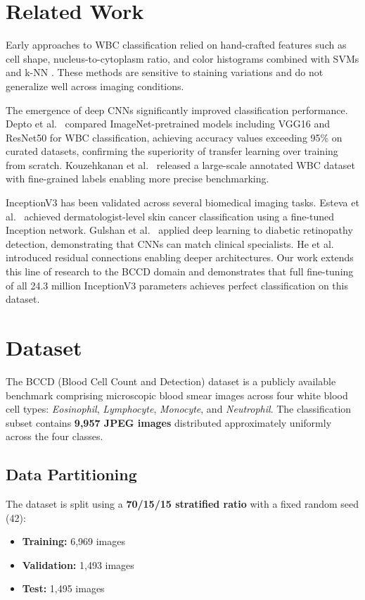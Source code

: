 \documentclass[conference]{IEEEtran}
\begin{document}
\section{Related Work}

Early approaches to WBC classification relied on hand-crafted features such as cell shape, nucleus-to-cytoplasm ratio, and color histograms combined with SVMs and k-NN \cite{kouz2022}. These methods are sensitive to staining variations and do not generalize well across imaging conditions.

The emergence of deep CNNs significantly improved classification performance. Depto et al.\ \cite{depto2021} compared ImageNet-pretrained models including VGG16 and ResNet50 for WBC classification, achieving accuracy values exceeding 95\% on curated datasets, confirming the superiority of transfer learning over training from scratch. Kouzehkanan et al.\ \cite{kouz2022} released a large-scale annotated WBC dataset with fine-grained labels enabling more precise benchmarking.

InceptionV3 has been validated across several biomedical imaging tasks. Esteva et al.\ \cite{esteva2017} achieved dermatologist-level skin cancer classification using a fine-tuned Inception network. Gulshan et al.\ \cite{gulshan2016} applied deep learning to diabetic retinopathy detection, demonstrating that CNNs can match clinical specialists. He et al.\ \cite{he2016} introduced residual connections enabling deeper architectures. Our work extends this line of research to the BCCD domain and demonstrates that full fine-tuning of all 24.3 million InceptionV3 parameters achieves perfect classification on this dataset.

\section{Dataset}

The BCCD (Blood Cell Count and Detection) dataset \cite{bccd2026} is a publicly available benchmark comprising microscopic blood smear images across four white blood cell types: \textit{Eosinophil}, \textit{Lymphocyte}, \textit{Monocyte}, and \textit{Neutrophil}. The classification subset contains \textbf{9,957 JPEG images} distributed approximately uniformly across the four classes.

\subsection{Data Partitioning}
The dataset is split using a \textbf{70/15/15 stratified ratio} with a fixed random seed (42):
\begin{itemize}
  \item \textbf{Training:} 6,969 images
  \item \textbf{Validation:} 1,493 images
  \item \textbf{Test:} 1,495 images
\end{itemize}
\end{document}
